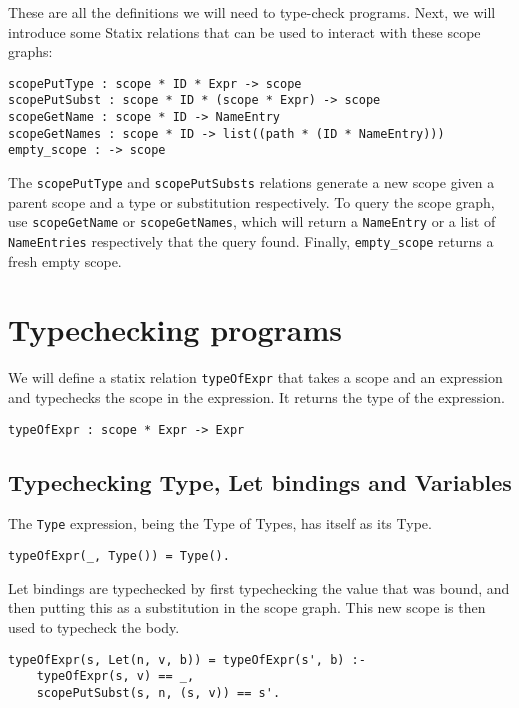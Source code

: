 These are all the definitions we will need to type-check programs. Next, we will introduce some Statix relations that can be used to interact with these scope graphs:

\begin{lstlisting}
scopePutType : scope * ID * Expr -> scope
scopePutSubst : scope * ID * (scope * Expr) -> scope
scopeGetName : scope * ID -> NameEntry
scopeGetNames : scope * ID -> list((path * (ID * NameEntry)))
empty_scope : -> scope
\end{lstlisting}

The \verb|scopePutType| and \verb|scopePutSubsts| relations generate a new scope given a parent scope and a type or substitution respectively. To query the scope graph, use \verb|scopeGetName| or \verb|scopeGetNames|, which will return a \verb|NameEntry| or a list of \verb|NameEntries| respectively that the query found. Finally, \verb|empty_scope| returns a fresh empty scope.

\section{Typechecking programs}

We will define a statix relation \verb|typeOfExpr| that takes a scope and an expression and typechecks the scope in the expression. It returns the type of the expression.

\begin{lstlisting}
typeOfExpr : scope * Expr -> Expr
\end{lstlisting}

\subsection{Typechecking Type, Let bindings and Variables}

The \verb|Type| expression, being the Type of Types, has itself as its Type.

\begin{lstlisting}
typeOfExpr(_, Type()) = Type().
\end{lstlisting}

Let bindings are typechecked by first typechecking the value that was bound, and then putting this as a substitution in the scope graph. This new scope is then used to typecheck the body.

\begin{lstlisting}
typeOfExpr(s, Let(n, v, b)) = typeOfExpr(s', b) :-
	typeOfExpr(s, v) == _,
	scopePutSubst(s, n, (s, v)) == s'.
\end{lstlisting}

